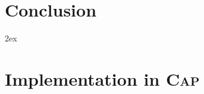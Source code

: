 \documentclass{article}
\begin{document}
\section{Conclusion}


\begingroup
     \parindent 0pt
     \parskip 2ex
     \def\enotesize{\normalsize}
     \theendnotes
\endgroup 



\appendix
\renewcommand{\thesection}{\Alph{section}}
\section{Implementation in \textsc{Cap}}

\end{document}
